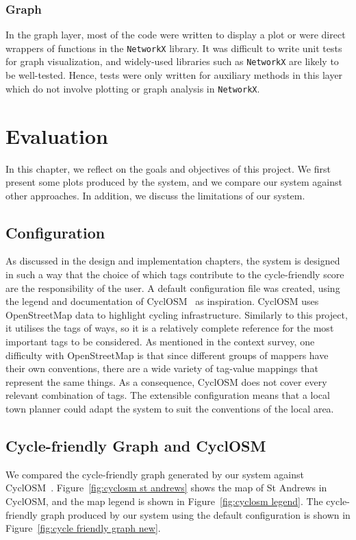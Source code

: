 \documentclass[12pt,a4paper]{report}
\begin{document}
\subsection{Graph}
In the graph layer, most of the code were written to display a plot or were direct wrappers of functions in the \texttt{NetworkX} library. It was difficult to write unit tests for graph visualization, and widely-used libraries such as \texttt{NetworkX} are likely to be well-tested. Hence, tests were only written for auxiliary methods in this layer which do not involve plotting or graph analysis in \texttt{NetworkX}.

\chapter{Evaluation}\label{chapter:eval}
In this chapter, we reflect on the goals and objectives of this project. We first present some plots produced by the system, and we compare our system against other approaches. In addition, we discuss the limitations of our system.

\section{Configuration}
As discussed in the design and implementation chapters, the system is designed in such a way that the choice of which tags contribute to the cycle-friendly score are the responsibility of the user. A default configuration file was created, using the legend and documentation of CyclOSM~\cite{cycleOSM} as inspiration. CyclOSM uses OpenStreetMap data to highlight cycling infrastructure. Similarly to this project, it utilises the tags of ways, so it is a relatively complete reference for the most important tags to be considered. As mentioned in the context survey, one difficulty with OpenStreetMap is that since different groups of mappers have their own conventions, there are a wide variety of tag-value mappings that represent the same things. As a consequence, CyclOSM does not cover every relevant combination of tags. The extensible configuration means that a local town planner could adapt the system to suit the conventions of the local area.

\section{Cycle-friendly Graph and CyclOSM} \label{sec:eval_osm}
We compared the cycle-friendly graph generated by our system against CyclOSM~\cite{cycleOSM}. Figure~\ref{fig:cyclosm st andrews} shows the map of St Andrews in CyclOSM, and the map legend is shown in Figure~\ref{fig:cyclosm legend}. The cycle-friendly graph produced by our system using the default configuration is shown in Figure~\ref{fig:cycle friendly graph new}.
\end{document}
